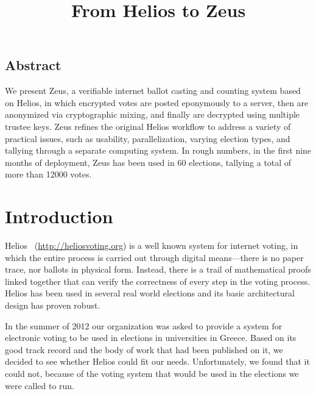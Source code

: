 \documentclass[letterpaper,10pt]{article}
\begin{document}
\date{}

\title{\Large \bf From Helios to Zeus}



\maketitle

\thispagestyle{empty}

\subsection*{Abstract}

We present Zeus, a verifiable internet ballot casting and counting
system based on Helios, in which encrypted votes are posted
eponymously to a server, then are anonymized via cryptographic mixing,
and finally are decrypted using multiple trustee keys. Zeus refines
the original Helios workflow to address a variety of practical issues,
such as usability, parallelization, varying election types, and
tallying through a separate computing system. In rough numbers, in the
first nine months of deployment, Zeus has been used in 60 elections,
tallying a total of more than 12000 votes.

\section{Introduction}

Helios~\cite{adida:2008} (\url{http://heliosvoting.org}) is a well
known system for internet voting, in which the entire process is
carried out through digital means---there is no paper trace, nor
ballots in physical form. Instead, there is a trail of mathematical
proofs linked together that can verify the correctness of every step
in the voting process. Helios has been used in several real world
elections and its basic architectural design has proven robust.

In the summer of 2012 our organization was asked to provide a system
for electronic voting to be used in elections in universities in
Greece. Based on its good track record and the body of work that had
been published on it, we decided to see whether Helios could fit our
needs. Unfortunately, we found that it could not, because of the
voting system that would be used in the elections we were called to
run.
\end{document}

